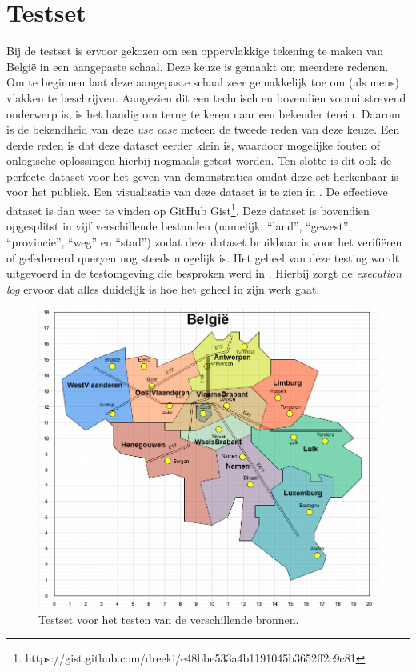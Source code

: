 \section{Testset}
\label{sec:testset}
Bij de testset is ervoor gekozen om een oppervlakkige tekening te maken van België in een aangepaste schaal. Deze keuze is gemaakt om meerdere redenen. Om te beginnen laat deze aangepaste schaal zeer gemakkelijk toe om (als mens) vlakken te beschrijven. Aangezien dit een technisch en bovendien vooruitstrevend onderwerp is, is het handig om terug te keren naar een bekender terein. Daarom is de bekendheid van deze \textit{use case} meteen de tweede reden van deze keuze. Een derde reden is dat deze dataset eerder klein is, waardoor mogelijke fouten of onlogische oplossingen hierbij nogmaals getest worden. Ten slotte is dit ook de perfecte dataset voor het geven van demonstraties omdat deze set herkenbaar is voor het publiek. Een visualisatie van deze dataset is te zien in . De effectieve dataset is dan weer te vinden op GitHub Gist\footnote{https://gist.github.com/dreeki/e48bbe533a4b1191045b3652ff2c9c81}. Deze dataset is bovendien opgesplitst in vijf verschillende bestanden (namelijk: ``land'', ``gewest'', ``provincie'', ``weg'' en ``stad'') zodat deze dataset bruikbaar is voor het verifiëren of gefedereerd queryen nog steeds mogelijk is. Het geheel van deze testing wordt uitgevoerd in de testomgeving die besproken werd in . Hierbij zorgt de \textit{execution log} ervoor dat alles duidelijk is hoe het geheel in zijn werk gaat.

\begin{figure}
    \centering
    \includegraphics[width=\linewidth]{images/geosparql_demo.png}
    \caption{Testset voor het testen van de verschillende bronnen.}
    \label{fig:demoset}
\end{figure}



